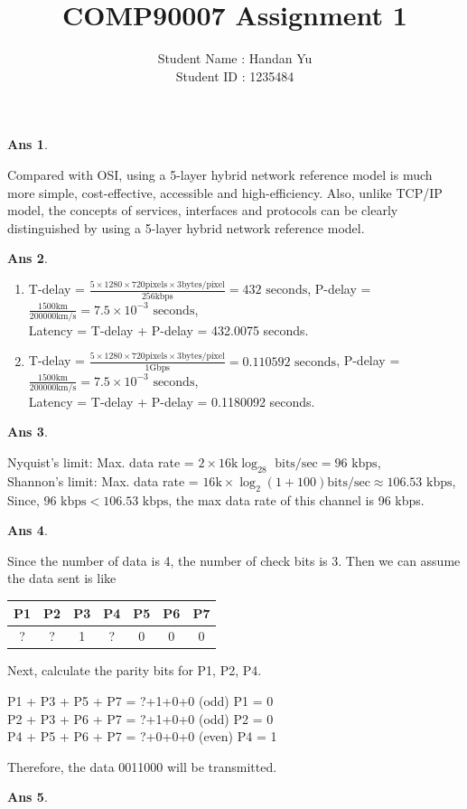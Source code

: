 \documentclass[11pt]{article} %
\title{COMP90007 Assignment 1}  %
\author{Student Name : Handan Yu\\ Student ID : 1235484}
\newtheorem{Q}{Ans}
\begin{document}
\date{}
\maketitle 
 \begin{Q}
 \end{Q}
Compared with OSI, using a 5-layer hybrid network reference model is much more simple, cost-effective, accessible and high-efficiency. Also, unlike TCP/IP model, the concepts of services, interfaces and protocols can be clearly distinguished by using a 5-layer hybrid network reference model.\\
 \begin{Q}
 \end{Q}
 \begin{enumerate}[(1)]
 \item T-delay = $\frac{5\times 1280\times 720\text{pixels} \times3\text{bytes/pixel}}{256\text{kbps}} =432 \text{ seconds}$, 
 P-delay = $\frac{1500\text{km}}{200000\text{km/s}} = 7.5\times 10^{-3}\text{ seconds}$,\\
 Latency = T-delay + P-delay = 432.0075 seconds.
 \item T-delay = $\frac{5\times 1280\times 720\text{pixels} \times3\text{bytes/pixel}}{1\text{Gbps}} =0.110592 \text{ seconds}$,
 P-delay = $ \frac{1500\text{km}}{200000\text{km/s}} = 7.5\times 10^{-3}\text{ seconds} $,\\
 Latency = T-delay + P-delay = 0.1180092 seconds.\\
  \end{enumerate}
  \begin{Q}
 \end{Q}
Nyquist’s limit:  Max. data rate = $2\times 16\text{k}\log_28\text{ bits/sec} = 96 \text{ kbps}$,\\
Shannon’s limit: Max. data rate = $16\text{k}\times \log_2(1+100) \text{bits/sec} \approx 106.53 \text{ kbps}$,\\
 Since, $96 \text{ kbps} < 106.53 \text{ kbps}$, the max data rate of this channel is 96 kbps.\\
  \begin{Q}
 \end{Q}
 Since the number of data is 4, the number of check bits is 3.
 Then we can assume the data sent is like
 \begin{center}
 \begin{tabular}{|c|c|c|c|c|c|c|}
 \hline
 P1&P2&P3&P4&P5&P6&P7\\
 \hline
 ?&?&1&?&0&0&0\\
 \hline
 \end{tabular}
 \end{center}
Next, calculate the parity bits for P1, P2, P4.
\begin{center}
P1 + P3 + P5 + P7 = ?+1+0+0 (odd)  P1 = 0\\
P2 + P3 + P6 + P7 = ?+1+0+0 (odd)   P2 = 0\\
P4 + P5 + P6 + P7 = ?+0+0+0 (even) P4 = 1\\
 \end{center}
 Therefore, the data 0011000 will be  transmitted.
 \\
  \begin{Q}
 \end{Q}
 
\end{document}

